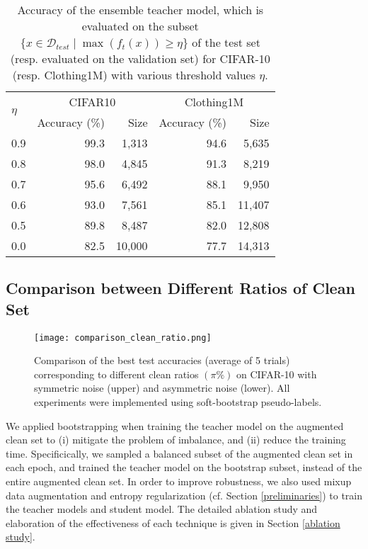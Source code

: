 \documentclass[conference]{IEEEtran}
\begin{document}
\begin{table}[htb!]
\caption{Accuracy of the ensemble teacher model, which is evaluated on the subset  $\{x\in \mathcal{D}_{test}\mid\max(f_t(x))\geq\eta\}$ of the test set (resp. evaluated on the validation set) for CIFAR-10 (resp. Clothing1M) with various threshold values $\eta$.\\[-1.5em]}
\label{teacher model}
\centering
\begin{tabular}{lrr|rr}
\toprule
\multirow{2}{*}{$\eta$} & \multicolumn{2}{c|}{CIFAR10} & \multicolumn{2}{c}{Clothing1M} \\ \cmidrule{2-5}
 & Accuracy (\%) & Size   & Accuracy (\%)   & Size \\ \midrule
0.9 & 99.3   & 1,313  & 94.6  & 5,635   \\
0.8 & 98.0   & 4,845  & 91.3  & 8,219   \\
0.7 & 95.6   & 6,492  & 88.1  & 9,950   \\
0.6 & 93.0   & 7,561  & 85.1  & 11,407  \\
0.5 & 89.8   & 8,487  & 82.0  & 12,808  \\
0.0 & 82.5   & 10,000 & 77.7  & 14,313  \\ \bottomrule
\end{tabular}
\end{table}



\subsection{Comparison between Different Ratios of Clean Set}
\begin{figure}[tb]
\centering
\texttt{[image: comparison\_clean\_ratio.png]}
\caption{Comparison of the best test accuracies (average of 5 trials) corresponding to different clean ratios $(\pi\%)$ on  CIFAR-10 with symmetric noise (upper) and asymmetric noise (lower). All experiments were implemented using soft-bootstrap pseudo-labels.}
\label{Comparison clean ratio}
\end{figure}







We applied bootstrapping when training the teacher model on the augmented clean set to (i) mitigate the problem of imbalance, and (ii) reduce the training time. Specificically, we sampled a balanced subset of the augmented clean set in each epoch, and trained the teacher model on the bootstrap subset, instead of the entire augmented clean set. In order to improve robustness, we also used mixup data augmentation and entropy regularization (cf. Section \ref{preliminaries}) to train the teacher models and student model. The detailed ablation study and elaboration of the effectiveness of each technique is given in Section \ref{ablation study}.
\end{document}
